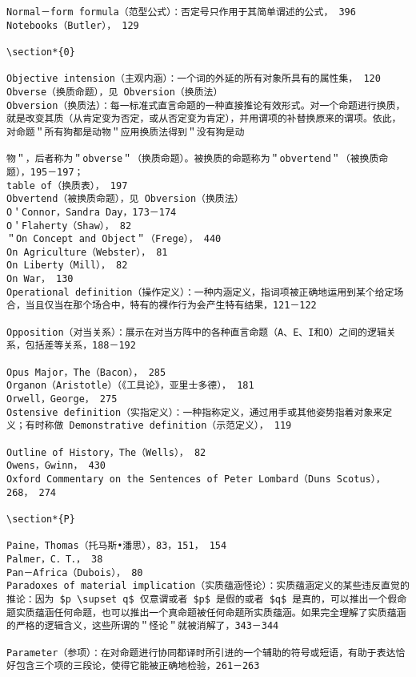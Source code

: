 \begin{verbatim}
Normal－form formula（范型公式）：否定号只作用于其简单谓述的公式， 396
Notebooks（Butler）， 129

\section*{0}

Objective intension（主观内涵）：一个词的外延的所有对象所具有的属性集， 120
Obverse（换质命题），见 Obversion（换质法）
Obversion（换质法）：每一标准式直言命题的一种直接推论有效形式。对一个命题进行换质，就是改变其质（从肯定变为否定，或从否定变为肯定），并用谓项的补替换原来的谓项。依此，对命题＂所有狗都是动物＂应用换质法得到＂没有狗是动

物＂，后者称为＂obverse＂（换质命题）。被换质的命题称为＂obvertend＂（被换质命题），195－197；
table of（换质表）， 197
Obvertend（被换质命题），见 Obversion（换质法）
O＇Connor，Sandra Day，173－174
O＇Flaherty（Shaw）， 82
＂On Concept and Object＂（Frege）， 440
On Agriculture（Webster）， 81
On Liberty（Mill）， 82
On War， 130
Operational definition（操作定义）：一种内涵定义，指词项被正确地运用到某个给定场合，当且仅当在那个场合中，特有的裸作行为会产生特有结果，121－122

Opposition（对当关系）：展示在对当方阵中的各种直言命题（A、E、I和O）之间的逻辑关系，包括差等关系，188－192

Opus Major，The（Bacon）， 285
Organon（Aristotle）（《工具论》，亚里士多德）， 181
Orwell，George， 275
Ostensive definition（实指定义）：一种指称定义，通过用手或其他姿势指着对象来定义；有时称做 Demonstrative definition（示范定义）， 119

Outline of History，The（Wells）， 82
Owens，Gwinn， 430
Oxford Commentary on the Sentences of Peter Lombard（Duns Scotus），268， 274

\section*{P}

Paine，Thomas（托马斯•潘思），83，151， 154
Palmer，C．T．， 38
Pan－Africa（Dubois）， 80
Paradoxes of material implication（实质蕴涵怪论）：实质蕴涵定义的某些违反直觉的推论：因为 $p \supset q$ 仅意谓或者 $p$ 是假的或者 $q$ 是真的，可以推出一个假命题实质蕴涵任何命题，也可以推出一个真命题被任何命题所实质蕴涵。如果完全理解了实质蕴涵的严格的逻辑含义，这些所谓的＂怪论＂就被消解了，343－344

Parameter（参项）：在对命题进行协同都译时所引进的一个辅助的符号或短语，有助于表达恰好包含三个项的三段论，使得它能被正确地检验，261－263


\end{verbatim}
